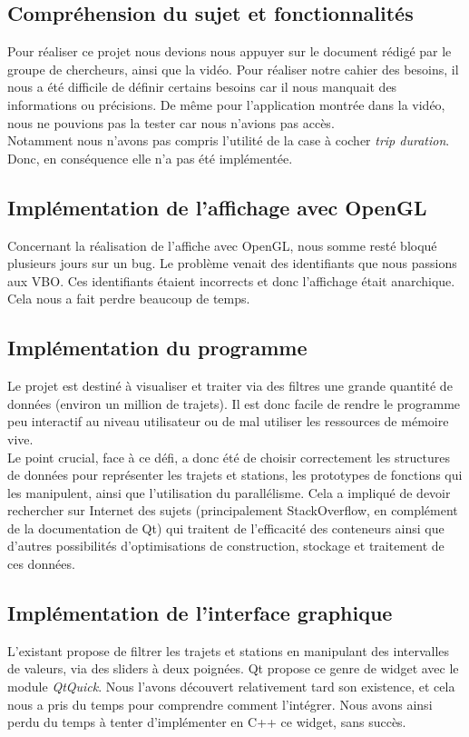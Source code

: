 \documentclass[12pt]{article}
\begin{document}
		\subsection{Compréhension du sujet et fonctionnalités}
		Pour réaliser ce projet nous devions nous appuyer sur le document rédigé par le groupe de
	chercheurs, ainsi que la vidéo. Pour réaliser notre cahier des besoins, il nous a été
	difficile de définir certains besoins car il nous manquait des informations ou précisions.
	De même pour l’application montrée dans la vidéo, nous ne pouvions pas la tester car nous
	n'avions pas accès.\\
	Notamment nous n'avons pas compris l'utilité de la case à cocher \textit{trip duration}. Donc, en
	conséquence elle n'a pas été implémentée.
	
		\subsection{Implémentation de l'affichage avec OpenGL}
	Concernant la réalisation de l’affiche avec OpenGL, nous somme resté bloqué plusieurs jours
	sur un bug. Le problème venait des identifiants que nous passions aux VBO. Ces identifiants
	étaient incorrects et donc l'affichage était anarchique.
	Cela nous a fait perdre beaucoup de temps.
	
	
		\subsection{Implémentation du programme}
		Le projet est destiné à visualiser et traiter via des filtres une grande quantité de données (environ un million de trajets). Il est donc facile de rendre le programme peu interactif au niveau utilisateur ou de mal utiliser les ressources de mémoire vive.\\

Le point crucial, face à ce défi, a donc été de choisir correctement les structures de données pour représenter les trajets et stations, les prototypes de fonctions qui les manipulent, ainsi que l’utilisation du parallélisme. Cela a impliqué de devoir rechercher sur Internet des sujets (principalement StackOverflow, en complément de la documentation de Qt) qui traitent de l’efficacité des conteneurs ainsi que d’autres possibilités d’optimisations de construction, stockage et traitement de ces données.
		
		
		\subsection{Implémentation de l’interface graphique}	
		L’existant propose de filtrer les trajets et stations en manipulant des intervalles de valeurs, via des sliders à deux poignées. Qt propose ce genre de widget avec le module \textit{QtQuick}. Nous l’avons découvert relativement tard son existence, et cela nous a pris du temps pour comprendre comment l'intégrer. Nous avons ainsi perdu du temps à tenter d’implémenter en C++ ce widget, sans succès.\\
	
\end{document}
